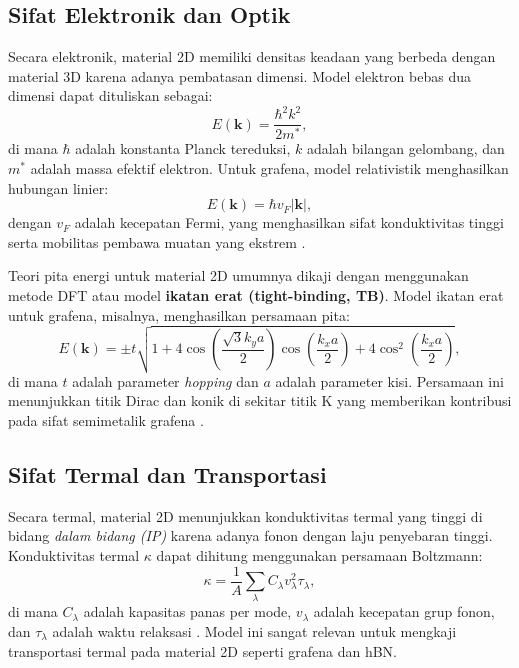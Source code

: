 \subsection{Sifat Elektronik dan Optik}
Secara elektronik, material 2D memiliki densitas keadaan yang berbeda dengan material 3D karena adanya pembatasan dimensi. Model elektron bebas dua dimensi dapat dituliskan sebagai:
\begin{equation}
    E(\mathbf{k}) = \frac{\hbar^2 k^2}{2m^*},
\end{equation}
di mana \( \hbar \) adalah konstanta Planck tereduksi, \( k \) adalah bilangan gelombang, dan \( m^* \) adalah massa efektif elektron. Untuk grafena, model relativistik menghasilkan hubungan linier:
\begin{equation}
    E(\mathbf{k}) = \hbar v_F |\mathbf{k}|,
\end{equation}
dengan \( v_F \) adalah kecepatan Fermi, yang menghasilkan sifat konduktivitas tinggi serta mobilitas pembawa muatan yang ekstrem \citep{novoselov_electric_2004,castro_neto_electronic_2009}.  
   
Teori pita energi untuk material 2D umumnya dikaji dengan menggunakan metode DFT atau model \textbf{ikatan erat (tight-binding, TB)}. Model ikatan erat untuk grafena, misalnya, menghasilkan persamaan pita:
\begin{equation}
    E(\mathbf{k}) = \pm t \sqrt{1 + 4\cos\left(\frac{\sqrt{3}k_y a}{2}\right)\cos\left(\frac{k_x a}{2}\right) + 4\cos^2\left(\frac{k_x a}{2}\right)},
\end{equation}
di mana \( t \) adalah parameter \emph{hopping} dan \( a \) adalah parameter kisi. Persamaan ini menunjukkan titik Dirac dan konik di sekitar titik K yang memberikan kontribusi pada sifat semimetalik grafena \citep{castro_neto_electronic_2009}.

\subsection{Sifat Termal dan Transportasi}
Secara termal, material 2D menunjukkan konduktivitas termal yang tinggi di bidang \emph{dalam bidang (IP)} karena adanya fonon dengan laju penyebaran tinggi. Konduktivitas termal \(\kappa\) dapat dihitung menggunakan persamaan Boltzmann:
\begin{equation}
    \kappa = \frac{1}{A} \sum_{\lambda} C_{\lambda} v_{\lambda}^2 \tau_{\lambda},
\end{equation}
di mana \( C_{\lambda} \) adalah kapasitas panas per mode, \( v_{\lambda} \) adalah kecepatan grup fonon, dan \( \tau_{\lambda} \) adalah waktu relaksasi \citep{das_beyond_2015}. Model ini sangat relevan untuk mengkaji transportasi termal pada material 2D seperti grafena dan hBN.
  
